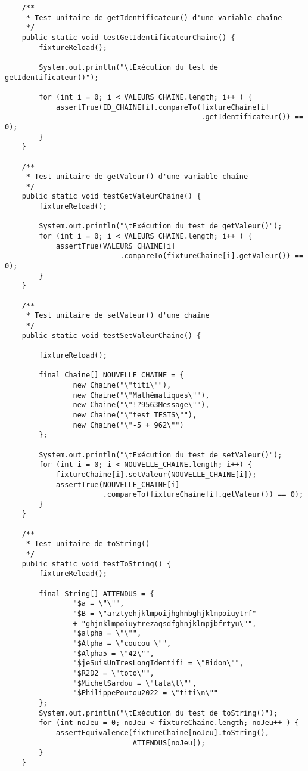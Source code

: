 \begin{enum}
\begin{verbatim}
    /** 
     * Test unitaire de getIdentificateur() d'une variable chaîne
     */
    public static void testGetIdentificateurChaine() {
        fixtureReload();
        
        System.out.println("\tExécution du test de getIdentificateur()");
        
        for (int i = 0; i < VALEURS_CHAINE.length; i++ ) {
            assertTrue(ID_CHAINE[i].compareTo(fixtureChaine[i]
                                              .getIdentificateur()) == 0);
        }
    }
    
    /** 
     * Test unitaire de getValeur() d'une variable chaîne
     */
    public static void testGetValeurChaine() {
        fixtureReload();
        
        System.out.println("\tExécution du test de getValeur()");
        for (int i = 0; i < VALEURS_CHAINE.length; i++ ) {
            assertTrue(VALEURS_CHAINE[i]
                           .compareTo(fixtureChaine[i].getValeur()) == 0);
        }
    }
    
    /** 
     * Test unitaire de setValeur() d'une chaîne
     */
    public static void testSetValeurChaine() {
        
        fixtureReload();
        
        final Chaine[] NOUVELLE_CHAINE = {
                new Chaine("\"titi\""),
                new Chaine("\"Mathématiques\""),
                new Chaine("\"!?9563Message\""),
                new Chaine("\"test TESTS\""),
                new Chaine("\"-5 + 962\"")
        };
        
        System.out.println("\tExécution du test de setValeur()");
        for (int i = 0; i < NOUVELLE_CHAINE.length; i++) {
            fixtureChaine[i].setValeur(NOUVELLE_CHAINE[i]);
            assertTrue(NOUVELLE_CHAINE[i]
                       .compareTo(fixtureChaine[i].getValeur()) == 0);
        }
    }
    
    /** 
     * Test unitaire de toString()
     */
    public static void testToString() {
        fixtureReload();
        
        final String[] ATTENDUS = {
                "$a = \"\"",
                "$B = \"arztyehjklmpoijhghnbghjklmpoiuytrf" 
                + "ghjnklmpoiuytrezaqsdfghnjklmpjbfrtyu\"",
                "$alpha = \"\"",
                "$Alpha = \"coucou \"",
                "$Alpha5 = \"42\"",
                "$jeSuisUnTresLongIdentifi = \"Bidon\"",
                "$R2D2 = \"toto\"",
                "$MichelSardou = \"tata\t\"",
                "$PhilippePoutou2022 = \"titi\n\""
        };
        System.out.println("\tExécution du test de toString()");        
        for (int noJeu = 0; noJeu < fixtureChaine.length; noJeu++ ) {
            assertEquivalence(fixtureChaine[noJeu].toString(), 
                              ATTENDUS[noJeu]);
        }
    }
    

\end{verbatim}
\end{enum}
